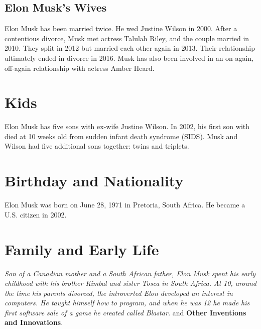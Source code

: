 \documentclass{article}                    %
\begin{document}
\subsection{Elon Musk’s Wives}                        %
Elon Musk has been married twice. He wed Justine Wilson in 2000. After a contentious divorce, Musk met actress Talulah Riley, and the couple married in 2010. They split in 2012 but married each other again in 2013. Their relationship ultimately ended in divorce in 2016. Musk has also been involved in an on-again, off-again relationship with actress Amber Heard.
\section{Kids}
Elon Musk has five sons with ex-wife Justine Wilson. In 2002, his first son with died at 10 weeks old from sudden infant death syndrome (SIDS). Musk and Wilson had five additional sons together: twins and triplets.
\newpage

\section{{\textbf{Birthday and Nationality}}}                %
Elon Musk was born on June 28, 1971 in Pretoria, South Africa. He became a U.S. citizen in 2002. 
\section{{\textbf{Family and Early Life}}}
\textit{Son of a Canadian mother and a South African father, Elon Musk spent his early childhood with his brother Kimbal and sister Tosca in South Africa. At 10, around the time his parents divorced, the introverted Elon developed an interest in computers. He taught himself how to program, and when he was 12 he made his first software sale of a game he created called Blastar.} and 
\textbf{Other Inventions and Innovations}.
\end{document}
